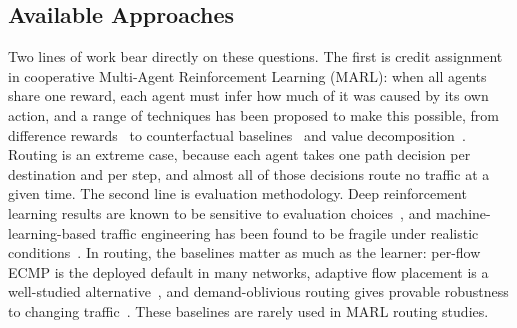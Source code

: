 \documentclass[10pt,journal,comsoc]{IEEEtran}
\begin{document}
\subsection{Available Approaches}
Two lines of work bear directly on these questions. The first is credit assignment in cooperative Multi-Agent Reinforcement Learning (MARL): when all agents share one reward, each agent must infer how much of it was caused by its own action, and a range of techniques has been proposed to make this possible, from difference rewards~\cite{agogino2004unifying} to counterfactual baselines~\cite{foerster2018counterfactual} and value decomposition~\cite{sunehag2018value}. Routing is an extreme case, because each agent takes one path decision per destination and per step, and almost all of those decisions route no traffic at a given time. The second line is evaluation methodology. Deep reinforcement learning results are known to be sensitive to evaluation choices~\cite{henderson2018deep}, and machine-learning-based traffic engineering has been found to be fragile under realistic conditions~\cite{bernardez2021machine}. In routing, the baselines matter as much as the learner: per-flow ECMP is the deployed default in many networks, adaptive flow placement is a well-studied alternative~\cite{alfares2010hedera,alizadeh2014conga}, and demand-oblivious routing gives provable robustness to changing traffic~\cite{applegate2003making,azar2003optimal}. These baselines are rarely used in MARL routing studies.
\end{document}
